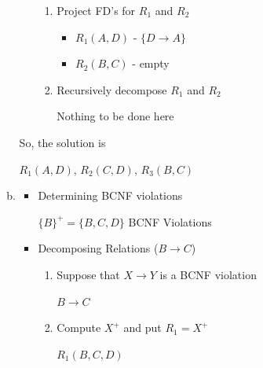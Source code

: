 \documentclass[12pt]{article}
\begin{document}
\begin{enumerate}[1.]
\begin{enumerate}[a)]
\begin{itemize}
\begin{enumerate}[1.]
                \item Project FD's for $R_1$ and $R_2$

                \bigskip

                \begin{itemize}
                    \item $R_1(A,D)$ - \color{red}$\{D \to A\}$\color{black}
                    \item $R_2(B,C)$ - \color{red}empty\color{black}

                \end{itemize}
                \item Recursively decompose $R_1$ and $R_2$

                \bigskip

                Nothing to be done here
            \end{enumerate}

        \end{itemize}

        \bigskip

        So, the solution is

        \bigskip

        $R_1(A,D)$, $R_2(C,D)$, $R_3(B,C)$

        \item


        \begin{itemize}
            \item Determining BCNF violations


            \bigskip

            $\{B\}^+ = \{B,C,D\}$ \color{red}BCNF Violations\color{black}

            \bigskip

            \item Decomposing Relations ($B \to C$)

            \begin{enumerate}[1.]
                \item Suppose that $X \to Y$ is a BCNF violation

                \color{red}
                $B \to C$
                \color{black}

                \item Compute $X^+$ and put $R_1 = X^+$

                \color{red}
                $R_1(B,C,D)$
                \color{black}


\end{enumerate}
\end{itemize}
\end{enumerate}
\end{enumerate}
\end{document}
